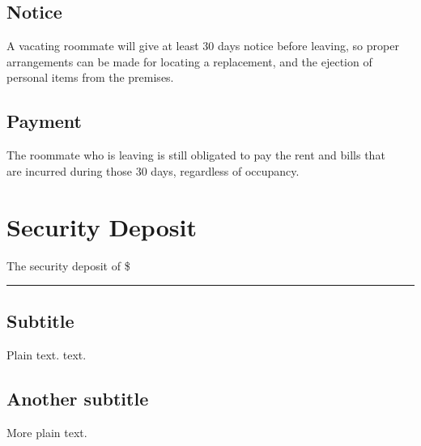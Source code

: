 \documentclass{Article}
\begin{document}
\subsection{Notice}
A vacating roommate will give at least 30 days notice before leaving, so proper \\
arrangements can be made for locating a replacement, and the ejection of\\
personal items from the premises.
\subsection{Payment}
The roommate who is leaving is still obligated to pay the rent and bills that \\
are incurred during those 30 days, regardless of occupancy. 

\section{Security Deposit}
The security deposit of \$\rule{20pt}{1pt} 




\subsection{Subtitle}

Plain text.
\Square
text.

\subsection{Another subtitle}

More plain text.
\end{document}
